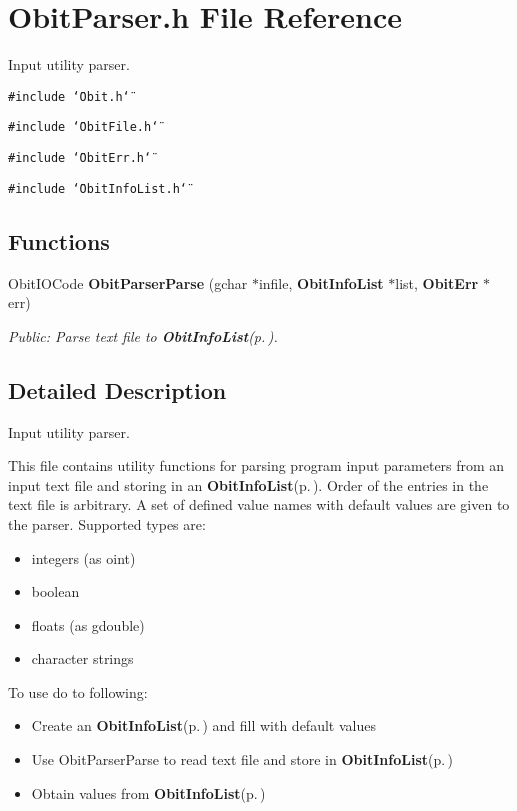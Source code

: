 \section{Obit\-Parser.h File Reference}
\label{ObitParser_8h}
Input utility parser. 

{\tt \#include \char`\"{}Obit.h\char`\"{}}\par
{\tt \#include \char`\"{}Obit\-File.h\char`\"{}}\par
{\tt \#include \char`\"{}Obit\-Err.h\char`\"{}}\par
{\tt \#include \char`\"{}Obit\-Info\-List.h\char`\"{}}\par
\subsection*{Functions}
\begin{CompactItemize}
\item 
Obit\-IOCode {\bf Obit\-Parser\-Parse} (gchar $\ast$infile, {\bf Obit\-Info\-List} $\ast$list, {\bf Obit\-Err} $\ast$err)
\begin{CompactList}\small\item\em Public: Parse text file to {\bf Obit\-Info\-List}{\rm (p.\,\pageref{structObitInfoList})}. \item\end{CompactList}\end{CompactItemize}


\subsection{Detailed Description}
Input utility parser. 

This file contains utility functions for parsing program input parameters from an input text file and storing in an {\bf Obit\-Info\-List}{\rm (p.\,\pageref{structObitInfoList})}. Order of the entries in the text file is arbitrary. A set of defined value names with default values are given to the parser. Supported types are: \begin{itemize}
\item integers (as oint) \item boolean \item floats (as gdouble) \item character strings\end{itemize}
To use do to following: \begin{itemize}
\item Create an {\bf Obit\-Info\-List}{\rm (p.\,\pageref{structObitInfoList})} and fill with default values \item Use Obit\-Parser\-Parse to read text file and store in {\bf Obit\-Info\-List}{\rm (p.\,\pageref{structObitInfoList})} \item Obtain values from {\bf Obit\-Info\-List}{\rm (p.\,\pageref{structObitInfoList})}\end{itemize}
